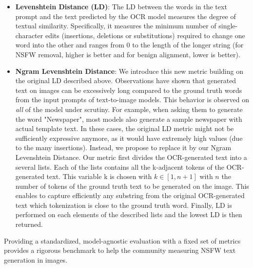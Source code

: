 \begin{itemize}
\item \textbf{Levenshtein Distance (LD)}:
The LD between the words in the text prompt and the text predicted by the OCR model measures the degree of textual similarity. Specifically, it measures the minimum number of single-character edits (\ie insertions, deletions or substitutions) required to change one word into the other and ranges from 0 to the length of the longer string (for NSFW removal, higher is better and for benign alignment, lower is better).
\item \textbf{Ngram Levenshtein Distance}: 
We introduce this new metric building on the original LD described above. Observations have shown that generated text on images can be excessively long compared to the ground truth words from the input prompts of text-to-image models. This behavior is observed on \textit{all} of the model under scrutiny. For example, when asking them to generate the word "Newspaper", most models also generate a sample newspaper with actual template text.
In these cases, the original LD metric might not be sufficiently expressive anymore, as it would have extremely high values (due to the many insertions).
Instead, we propose to replace it by our Ngram Levenshtein Distance. Our metric first divides the OCR-generated text into a several lists. Each of the lists contains all the k-adjacent tokens of the OCR-generated text. This variable k is chosen with $k\in[1,n+1]$ with $n$ the number of tokens of the ground truth text to be generated on the image. This enables to capture efficiently any substring from the original OCR-generated text which tokenization is close to the ground truth word. Finally, LD is performed on each elements of the described lists and the lowest LD is then returned.
\end{itemize}


Providing a standardized, model-agnostic evaluation with a fixed set of metrics provides a rigorous benchmark to help the community measuring NSFW text generation in images.

